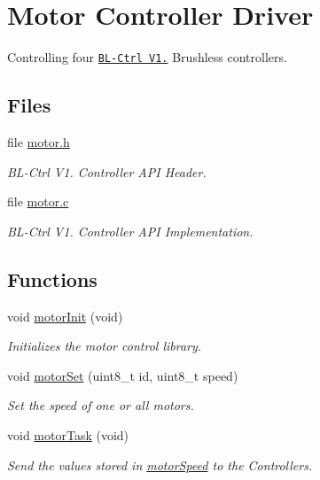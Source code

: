 \hypertarget{group__motor}{\section{Motor Controller Driver}
\label{group__motor}
}


Controlling four \href{https://www.mikrocontroller.com/index.php?main_page=product_info&products_id=209}{\tt B\-L-\/\-Ctrl V1.} Brushless controllers.  


\subsection*{Files}
\begin{DoxyCompactItemize}
\item 
file \hyperlink{motor_8h}{motor.\-h}
\begin{DoxyCompactList}\small\item\em B\-L-\/\-Ctrl V1. Controller A\-P\-I Header. \end{DoxyCompactList}\item 
file \hyperlink{motor_8c}{motor.\-c}
\begin{DoxyCompactList}\small\item\em B\-L-\/\-Ctrl V1. Controller A\-P\-I Implementation. \end{DoxyCompactList}\end{DoxyCompactItemize}
\subsection*{Functions}
\begin{DoxyCompactItemize}
\item 
void \hyperlink{group__motor_gaa29e2982047be0f7afbb10c8d6f3f5c3}{motor\-Init} (void)
\begin{DoxyCompactList}\small\item\em Initializes the motor control library. \end{DoxyCompactList}\item 
void \hyperlink{group__motor_gafde1750cdf4354c295108eec552d899d}{motor\-Set} (uint8\-\_\-t id, uint8\-\_\-t speed)
\begin{DoxyCompactList}\small\item\em Set the speed of one or all motors. \end{DoxyCompactList}\item 
void \hyperlink{group__motor_gab10642c396b1a6dc22edf2b45288d781}{motor\-Task} (void)
\begin{DoxyCompactList}\small\item\em Send the values stored in \hyperlink{group__motor_ga0b3c12451554c9ee060319cbe2553d3a}{motor\-Speed} to the Controllers. \end{DoxyCompactList}\end{DoxyCompactItemize}
